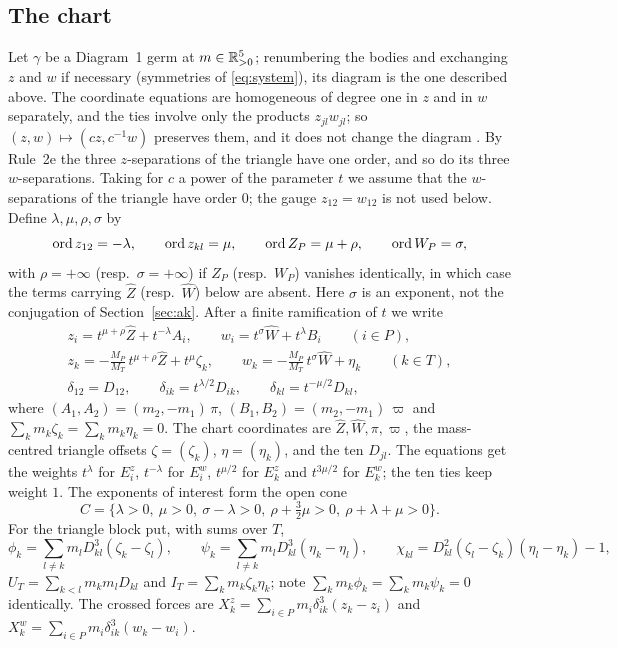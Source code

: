 \subsection{The chart}
Let $\gamma$ be a Diagram~1 germ at $m\in\mathbb{R}_{>0}^5$; renumbering the bodies and exchanging $z$ and $w$
if necessary (symmetries of \eqref{eq:system}), its diagram is the one described above.  The
coordinate equations are homogeneous of
degree one in $z$ and in $w$ separately, and the ties involve only the products $z_{jl}w_{jl}$;
so $(z,w)\mapsto(cz,c^{-1}w)$ preserves them, and it does not change the diagram
\cite[p.~547]{AK}.
By Rule~2e \cite[p.~552]{AK} the three $z$-separations of the triangle have one order, and so do
its three $w$-separations.  Taking for $c$ a power of the parameter $t$ we assume that the
$w$-separations of the triangle have order $0$; the gauge $z_{12}=w_{12}$ is not used below.
Define $\lambda,\mu,\rho,\sigma$ by
\[
  \operatorname{ord} z_{12}=-\lambda,\qquad \operatorname{ord} z_{kl}=\mu,\qquad \operatorname{ord} Z_P=\mu+\rho,\qquad \operatorname{ord} W_P=\sigma,
\]
with $\rho=+\infty$ (resp.\ $\sigma=+\infty$) if $Z_P$ (resp.\ $W_P$) vanishes identically, in
which case the terms carrying $\hat Z$ (resp.\ $\hat W$) below are absent.  Here $\sigma$ is an
exponent, not the conjugation of Section~\ref{sec:ak}.
After a finite ramification of $t$ we write
\begin{equation}\label{eq:d1-chart}
\begin{gathered}
  z_i=t^{\mu+\rho}\hat Z+t^{-\lambda}A_i,\qquad w_i=t^{\sigma}\hat W+t^{\lambda}B_i
  \qquad(i\in P),\\
  z_k=-\tfrac{M_P}{M_T}\,t^{\mu+\rho}\hat Z+t^{\mu}\zeta_k,\qquad
  w_k=-\tfrac{M_P}{M_T}\,t^{\sigma}\hat W+\eta_k\qquad(k\in T),\\
  \delta_{12}=D_{12},\qquad\delta_{ik}=t^{\lambda/2}D_{ik},\qquad\delta_{kl}=t^{-\mu/2}D_{kl},
\end{gathered}
\end{equation}
where $(A_1,A_2)=(m_2,-m_1)\,\pi$, $(B_1,B_2)=(m_2,-m_1)\,\varpi$ and
$\sum_km_k\zeta_k=\sum_km_k\eta_k=0$.  The chart coordinates are $\hat Z,\hat W,\pi,\varpi$, the
mass-centred triangle offsets $\zeta=(\zeta_k)$, $\eta=(\eta_k)$, and the ten $D_{jl}$.  The
equations get the weights $t^{\lambda}$ for $E^z_i$, $t^{-\lambda}$ for $E^w_i$, $t^{\mu/2}$ for
$E^z_k$ and $t^{3\mu/2}$ for $E^w_k$; the ten ties keep weight $1$.
The exponents of interest form the open cone
\begin{equation}\label{eq:d1-cone}
  C=\{\lambda>0,\ \mu>0,\ \sigma-\lambda>0,\ \rho+\tfrac32\mu>0,\ \rho+\lambda+\mu>0\}.
\end{equation}
For the triangle block put, with sums over $T$,
\[
  \phi_k=\sum_{l\ne k}m_lD_{kl}^3(\zeta_k-\zeta_l),\qquad
  \psi_k=\sum_{l\ne k}m_lD_{kl}^3(\eta_k-\eta_l),\qquad
  \chi_{kl}=D_{kl}^2(\zeta_l-\zeta_k)(\eta_l-\eta_k)-1,
\]
$U_T=\sum_{k<l}m_km_lD_{kl}$ and $I_T=\sum_km_k\zeta_k\eta_k$; note
$\sum_km_k\phi_k=\sum_km_k\psi_k=0$ identically.  The crossed forces are
$X^z_k=\sum_{i\in P}m_i\delta_{ik}^3(z_k-z_i)$ and $X^w_k=\sum_{i\in P}m_i\delta_{ik}^3(w_k-w_i)$.

